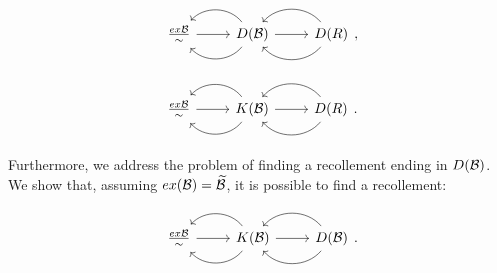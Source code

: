 \begin{equation*}
  \recdiagram{\frac{ex \B}{\sim}}{D(\B)}{D(R)},
\end{equation*}

\begin{equation*}
  \recdiagram{\frac{ex \B}{\sim}}{K(\B)}{D(R)}.
\end{equation*}

Furthermore, we address the problem of finding a recollement ending in $D(\mathcal{B})$. We show that, assuming $ex(\mathcal{B})=\widetilde{\mathcal{B}}$, it is possible to find a recollement:

\begin{equation*}
  \recdiagram{\frac{ex \B}{\sim}}{K(\B)}{D(\B)}.
\end{equation*}

